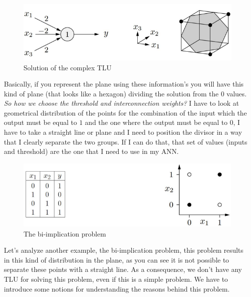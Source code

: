 \documentclass{article}
\begin{document}
\begin{figure}[H]
    \centering
    \includegraphics[scale=0.6]{images/three_input_sol_example.png}
    \caption{Solution of the complex TLU}
    \label{fig:example_three_sol}
\end{figure}
Basically, if you represent the plane using these information’s you will have this
kind of plane (that looks like a hexagon) dividing the solution from the $0$ values.
\newline\newline
\textit{So how we choose the threshold and interconnection weights?} I have to look at geometrical
distribution of the points for the combination of the input which the output must be equal to $1$
and the one where the output must be equal to $0$, I have to take a straight line or plane and I
need to position the divisor in a way that I clearly separate the two groups. If I can do that,
that set of values (inputs and threshold) are the one that I need to use in my ANN.
\begin{figure}[H]
    \centering
    \includegraphics[scale=0.6]{images/bi_implic_no_sol.png}
    \caption{The bi-implication problem}
    \label{fig:bi-impl-problem}
\end{figure}
Let’s analyze another example, the bi-implication problem, this problem results in this kind of
distribution in the plane, as you can see it is not possible to separate these points with a
straight line. As a consequence, we don’t have any TLU for solving this problem, even if this is
a simple problem. We have to introduce some notions for understanding the reasons behind
this problem.
\end{document}
